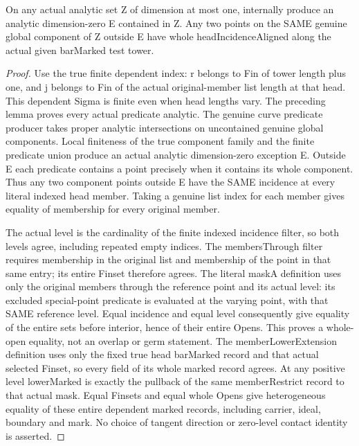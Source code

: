 \begin{theorem}
\label{hir:member-head-incidence-curve-exception}
\leanok
{}
On any actual analytic set Z of dimension at most one, internally produce an
analytic dimension-zero E contained in Z. Any two points on the SAME genuine
global component of Z outside E have whole headIncidenceAligned along the
actual given barMarked test tower.
\end{theorem}
\begin{proof}
Use the true finite dependent index: r belongs to Fin of tower length plus
one, and j belongs to Fin of the actual original-member list length at that
head. This dependent Sigma is finite even when head lengths vary. The preceding
lemma proves every actual predicate analytic. The genuine curve predicate
producer takes proper analytic intersections on uncontained genuine global
components. Local finiteness of the true component family and the finite
predicate union produce an actual analytic dimension-zero exception E.
Outside E each predicate contains a point precisely when it contains its
whole component. Thus any two component points outside E have the SAME
incidence at every literal indexed head member. Taking a genuine list index
for each member gives equality of membership for every original member.

The actual level is the cardinality of the finite indexed incidence filter,
so both levels agree, including repeated empty indices. The membersThrough
filter requires membership in the original list and membership of the point
in that same entry; its entire Finset therefore agrees. The literal maskA
definition uses only the original members through the reference point and
its actual level: its excluded special-point predicate is evaluated at the
varying point, with that SAME reference level. Equal incidence and equal
level consequently give equality of the entire sets before interior, hence
of their entire Opens. This proves a whole-open equality, not an overlap
or germ statement. The memberLowerExtension definition uses only the fixed
true head barMarked record and that actual selected Finset, so every field of
its whole marked record agrees. At any positive level lowerMarked is exactly
the pullback of the same memberRestrict record to that actual mask. Equal
Finsets and equal whole Opens give heterogeneous equality of these entire
dependent marked records, including carrier, ideal, boundary and mark. No
choice of tangent direction or zero-level contact identity is asserted.
\end{proof}

